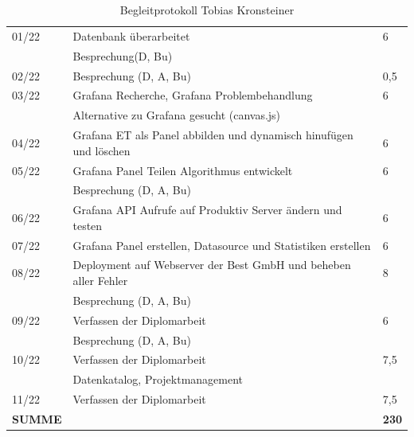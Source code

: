 \begin{table}[h]
\begin{tabular}{|l|l|l|}
		
		
		
		01/22   & Datenbank überarbeitet & 6	\\ 
	&Besprechung(D, Bu) & \\	\hline
		
		
		
		
		02/22   & Besprechung (D, A, Bu)  & 0,5	\\ \hline
		
		
		03/22   & Grafana Recherche, Grafana Problembehandlung  & 6	\\
		
			&Alternative zu Grafana gesucht (canvas.js)& \\
		
		 \hline
		
		
		
		
		
		
		04/22   & Grafana ET als Panel abbilden und dynamisch hinufügen und löschen & 6	\\ \hline
		
		
		05/22   & Grafana Panel Teilen Algorithmus entwickelt & 6	\\ 
		
	&Besprechung (D, A, Bu)& \\	\hline
		
		
		06/22   & Grafana API Aufrufe auf Produktiv Server ändern und testen& 6	\\ \hline
		
		
		
		07/22   & Grafana Panel erstellen, Datasource und Statistiken erstellen  & 6 \\ \hline
		
		
		
		08/22   &Deployment auf Webserver der Best GmbH und beheben aller Fehler & 8 \\
			& Besprechung (D, A, Bu) &	\\ \hline
		
		
		
		
		
		
		
		
		09/22   &Verfassen der Diplomarbeit& 6 \\ 
		& Besprechung (D, A, Bu) &	\\ \hline
		
		
		
		
		10/22   &Verfassen der Diplomarbeit& 7,5\\ 
			& Datenkatalog, Projektmanagement &	\\ \hline
			
					11/22   &Verfassen der Diplomarbeit& 7,5\\  \hline
			
		
	
		
	\textbf{SUMME} & & \textbf{230}\\ \hline
		
		
		
		
		
	\end{tabular}
	\caption{Begleitprotokoll Tobias Kronsteiner}
\label{tab:Begleitprotokoll Tobias Kronsteiner}
\end{table}
\newpage
